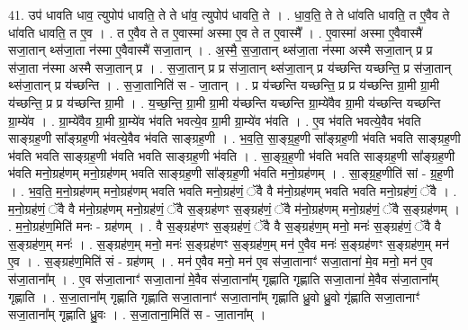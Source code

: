 \documentclass[17pt]{extarticle}
\begin{document}
41. उप॑ धावति धाव॒ त्युपोप॑ धावति॒ ते ते धा॑व॒ त्युपोप॑ धावति॒ ते । . धा॒व॒ति॒ ते ते धा॑वति धावति॒ त ए॒वैव ते धा॑वति धावति॒ त ए॒व । . त ए॒वैव ते त ए॒वास्मा॑ अस्मा ए॒व ते त ए॒वास्मै᳚ । . ए॒वास्मा॑ अस्मा ए॒वैवास्मै॑ सजा॒तान् थ्स॑जा॒ता न॑स्मा ए॒वैवास्मै॑ सजा॒तान् । . अ॒स्मै॒ स॒जा॒तान् थ्स॑जा॒ता न॑स्मा अस्मै सजा॒तान् प्र प्र स॑जा॒ता न॑स्मा अस्मै सजा॒तान् प्र । . स॒जा॒तान् प्र प्र स॑जा॒तान् थ्स॑जा॒तान् प्र य॑च्छन्ति यच्छन्ति॒ प्र स॑जा॒तान् थ्स॑जा॒तान् प्र य॑च्छन्ति । . स॒जा॒तानिति॑ स - जा॒तान् । . प्र य॑च्छन्ति यच्छन्ति॒ प्र प्र य॑च्छन्ति ग्रा॒मी ग्रा॒मी य॑च्छन्ति॒ प्र प्र य॑च्छन्ति ग्रा॒मी । . य॒च्छ॒न्ति॒ ग्रा॒मी ग्रा॒मी य॑च्छन्ति यच्छन्ति ग्रा॒म्ये॑वैव ग्रा॒मी य॑च्छन्ति यच्छन्ति ग्रा॒म्ये॑व । . ग्रा॒म्ये॑वैव ग्रा॒मी ग्रा॒म्ये॑व भ॑वति भवत्ये॒व ग्रा॒मी ग्रा॒म्ये॑व भ॑वति । . ए॒व भ॑वति भवत्ये॒वैव भ॑वति साङ्ग्रह॒णी सा᳚ङ्ग्रह॒णी भ॑वत्ये॒वैव भ॑वति साङ्ग्रह॒णी । . भ॒व॒ति॒ सा॒ङ्ग्र॒ह॒णी सा᳚ङ्ग्रह॒णी भ॑वति भवति साङ्ग्रह॒णी भ॑वति भवति साङ्ग्रह॒णी भ॑वति भवति साङ्ग्रह॒णी भ॑वति । . सा॒ङ्ग्र॒ह॒णी भ॑वति भवति साङ्ग्रह॒णी सा᳚ङ्ग्रह॒णी भ॑वति मनो॒ग्रह॑णम् मनो॒ग्रह॑णम् भवति साङ्ग्रह॒णी सा᳚ङ्ग्रह॒णी भ॑वति मनो॒ग्रह॑णम् । . सा॒ङ्ग्र॒ह॒णीति॑ सां - ग्र॒ह॒णी । . भ॒व॒ति॒ म॒नो॒ग्रह॑णम् मनो॒ग्रह॑णम् भवति भवति मनो॒ग्रह॑णं॒ ॅवै वै म॑नो॒ग्रह॑णम् भवति भवति मनो॒ग्रह॑णं॒ ॅवै । . म॒नो॒ग्रह॑णं॒ ॅवै वै म॑नो॒ग्रह॑णम् मनो॒ग्रह॑णं॒ ॅवै स॒ङ्ग्रह॑णꣳ स॒ङ्ग्रह॑णं॒ ॅवै म॑नो॒ग्रह॑णम् मनो॒ग्रह॑णं॒ ॅवै स॒ङ्ग्रह॑णम् । . म॒नो॒ग्रह॑ण॒मिति॑ मनः - ग्रह॑णम् । . वै स॒ङ्ग्रह॑णꣳ स॒ङ्ग्रह॑णं॒ ॅवै वै स॒ङ्ग्रह॑ण॒म् मनो॒ मनः॑ स॒ङ्ग्रह॑णं॒ ॅवै वै स॒ङ्ग्रह॑ण॒म् मनः॑ । . स॒ङ्ग्रह॑ण॒म् मनो॒ मनः॑ स॒ङ्ग्रह॑णꣳ स॒ङ्ग्रह॑ण॒म् मन॑ ए॒वैव मनः॑ स॒ङ्ग्रह॑णꣳ स॒ङ्ग्रह॑ण॒म् मन॑ ए॒व । . स॒ङ्ग्रह॑ण॒मिति॑ सं - ग्रह॑णम् । . मन॑ ए॒वैव मनो॒ मन॑ ए॒व स॑जा॒तानाꣳ॑ सजा॒ताना॑ मे॒व मनो॒ मन॑ ए॒व स॑जा॒ताना᳚म् । . ए॒व स॑जा॒तानाꣳ॑ सजा॒ताना॑ मे॒वैव स॑जा॒ताना᳚म् गृह्णाति गृह्णाति सजा॒ताना॑ मे॒वैव स॑जा॒ताना᳚म् गृह्णाति । . स॒जा॒ताना᳚म् गृह्णाति गृह्णाति सजा॒तानाꣳ॑ सजा॒ताना᳚म् गृह्णाति ध्रु॒वो ध्रु॒वो गृ॑ह्णाति सजा॒तानाꣳ॑ सजा॒ताना᳚म् गृह्णाति ध्रु॒वः । . स॒जा॒ताना॒मिति॑ स - जा॒ताना᳚म् । \newline
\pagebreak
{}
\end{document}
